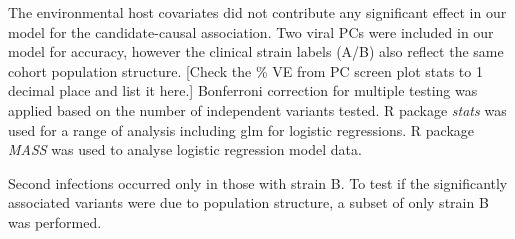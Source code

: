 \documentclass{article}
\begin{document}






The environmental host covariates did not contribute any significant effect in our model for the candidate-causal association.
Two viral PCs were included in our model for accuracy, however the clinical 
strain labels (A/B) also reflect the same cohort population structure.
[Check the \% VE from PC screen plot stats to 1 decimal place and list it here.]
Bonferroni correction for multiple testing was applied based on the number of independent variants tested.
R package \textit{stats} was used for a range of analysis including glm for logistic regressions. 
R package \textit{MASS} was used to analyse logistic regression model data.

Second infections occurred only in those with strain B. 
To test if the significantly associated variants were due to population structure, 
a subset of only strain B was performed. 
\end{document}
